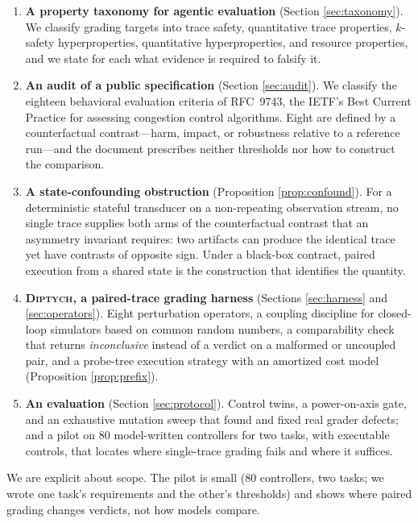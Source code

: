 \documentclass[conference]{IEEEtran}
\newcommand{\sys}{\textsc{Diptych}}
\begin{document}
	\begin{enumerate}
		\item \textbf{A property taxonomy for agentic evaluation} (Section
		\ref{sec:taxonomy}). We classify grading targets into trace safety,
		quantitative trace properties, $k$-safety hyperproperties, quantitative
		hyperproperties, and resource properties, and we state for each what
		evidence is required to falsify it.
		
		\item \textbf{An audit of a public specification} (Section \ref{sec:audit}).
		We classify the eighteen behavioral evaluation criteria of RFC~9743, the
		IETF's Best Current Practice for assessing congestion control
		algorithms. Eight are defined by a counterfactual contrast---harm,
		impact, or robustness relative to a reference run---and the document
		prescribes neither thresholds nor how to construct the comparison.
		
		\item \textbf{A state-confounding obstruction} (Proposition
		\ref{prop:confound}). For a deterministic stateful transducer on a
		non-repeating observation stream, no single trace supplies both arms of the
		counterfactual contrast that an asymmetry invariant requires: two
		artifacts can produce the identical trace yet have contrasts of opposite
		sign. Under a black-box contract, paired execution from a shared state
		is the construction that identifies the quantity.
		
		\item \textbf{\sys{}, a paired-trace grading harness} (Sections
		\ref{sec:harness} and \ref{sec:operators}). Eight perturbation operators, a
		coupling discipline for closed-loop simulators based on common random
		numbers, a comparability check that returns \emph{inconclusive}
		instead of a verdict on a malformed or uncoupled pair, and a probe-tree execution strategy with an amortized cost
		model (Proposition \ref{prop:prefix}).
		
		\item \textbf{An evaluation} (Section \ref{sec:protocol}). Control
		twins, a power-on-axis gate, and an exhaustive mutation sweep that found
		and fixed real grader defects; and a pilot on 80 model-written
		controllers for two tasks, with executable controls, that locates
		where single-trace grading fails and where it suffices.
	\end{enumerate}

	We are explicit about scope. The pilot is small (80 controllers, two
	tasks; we wrote one task's requirements and the other's thresholds) and
	shows where paired grading changes verdicts, not how models compare.
	
\end{document}
